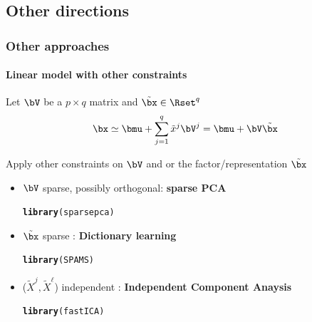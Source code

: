 \documentclass{beamer}\usepackage[]{graphicx}\usepackage[]{color}
\makeatletter
\newcommand{\hlstd}[1]{\textcolor[rgb]{0.345,0.345,0.345}{#1}}%
\newcommand{\hlkwd}[1]{\textcolor[rgb]{0.737,0.353,0.396}{\textbf{#1}}}%
\newenvironment{kframe}{%
 \def\at@end@of@kframe{}%
 \ifinner\ifhmode%
  \def\at@end@of@kframe{\end{minipage}}%
  \begin{minipage}{\columnwidth}%
 \fi\fi%
 \def\FrameCommand##1{\hskip\@totalleftmargin \hskip-\fboxsep
 \colorbox{shadecolor}{##1}\hskip-\fboxsep
     \hskip-\linewidth \hskip-\@totalleftmargin \hskip\columnwidth}%
 \MakeFramed {\advance\hsize-\width
   \@totalleftmargin\z@ \linewidth\hsize
   \@setminipage}}%
 {\par\unskip\endMakeFramed%
 \at@end@of@kframe}
\newenvironment{knitrout}{}{} %
\makeatother
\begin{document}
\subsection{Other directions}

\begin{frame}
  \frametitle{Other approaches}
  \framesubtitle{Linear model with other constraints}
    
    Let $\bV$ be a $p\times q$ matrix and $\tilde \bx \in \Rset^q$
    \begin{equation*}
      \bx \simeq  \bmu + \sum_{j=1}^q \tilde x^j \bV^j = \bmu + \bV \tilde\bx
    \end{equation*}
  
    Apply other constraints on $\bV$ and or the factor/representation $\tilde\bx$
    \begin{itemize}
      \item $\bV$ sparse, possibly orthogonal: \alert{\bf sparse PCA}\\
\begin{knitrout}\scriptsize
{}\color{fgcolor}\begin{kframe}
\begin{alltt}
\hlkwd{library}\hlstd{(sparsepca)}
\end{alltt}
\end{kframe}
\end{knitrout}
      \item $\tilde \bx$ sparse : \alert{\bf Dictionary learning}
\begin{knitrout}\scriptsize
{}\color{fgcolor}\begin{kframe}
\begin{alltt}
\hlkwd{library}\hlstd{(SPAMS)}
\end{alltt}
\end{kframe}
\end{knitrout}
      \item ($\tilde X^j, \tilde X^\ell$) independent : \alert{\bf Independent Component Anaysis}
\begin{knitrout}\scriptsize
{}\color{fgcolor}\begin{kframe}
\begin{alltt}
\hlkwd{library}\hlstd{(fastICA)}
\end{alltt}
\end{kframe}
\end{knitrout}
    \end{itemize}

\end{frame}
 
\end{document}
